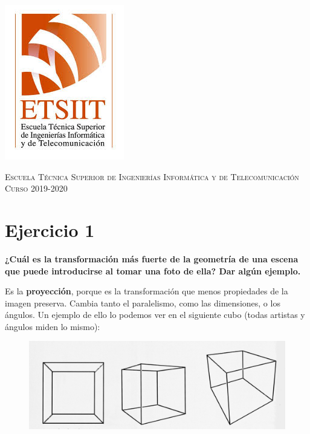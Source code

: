 \documentclass[11pt,a4paper]{article}
\begin{document}
\begin{titlepage}
\begin{minipage}{\textwidth}
\includegraphics[scale=0.3]{img/etsiit.jpeg}

\vspace{0.7cm}
\textsc{Escuela Técnica Superior de Ingenierías Informática y de Telecomunicación}\\
\vspace{1cm}
\textsc{Curso 2019-2020}
\end{minipage}
\end{titlepage}

\tableofcontents
\thispagestyle{empty}				%

\newpage

\setlength{\parskip}{1em}


\section*{Ejercicio 1}
\textbf{¿Cuál es la transformación más fuerte de la geometría de una escena que puede introducirse al tomar una foto de ella? Dar algún ejemplo.}

Es la \textbf{proyección}, porque es la transformación que menos propiedades de la imagen preserva. Cambia tanto el paralelismo, como las dimensiones,
o los ángulos. Un ejemplo de ello lo podemos ver en el siguiente cubo (todas artistas y ángulos miden lo mismo):
\begin{figure}[H]
\centering
\includegraphics[scale=0.6]{img/cubo.jpg}
\end{figure}
\end{document}
